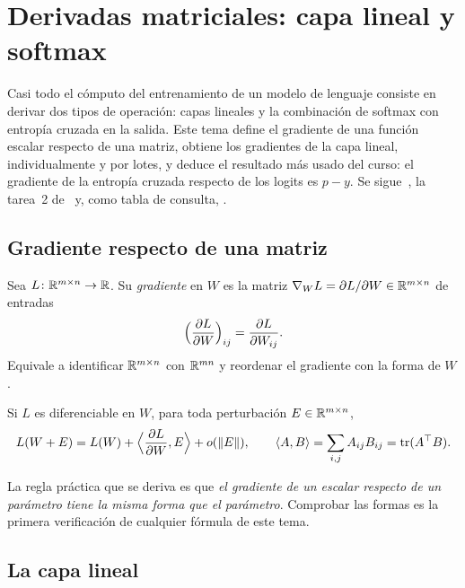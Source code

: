 \chapter{Derivadas matriciales: capa lineal y softmax}
\label{tema:3}

Casi todo el cómputo del entrenamiento de un modelo de lenguaje consiste en derivar dos tipos de operación: capas lineales y la combinación de softmax con entropía cruzada en la salida. Este tema define el gradiente de una función escalar respecto de una matriz, obtiene los gradientes de la capa lineal, individualmente y por lotes, y deduce el resultado más usado del curso: el gradiente de la entropía cruzada respecto de los logits es $p-y$. Se sigue~\cite[§5.3--§5.5]{mml}, la tarea~2 de~\cite{cs224n} y, como tabla de consulta, \cite{cookbook}.

\section{Gradiente respecto de una matriz}

\begin{definicion}\label{def:grad-matriz}
Sea $L\colon\mathbb{R}^{m\times n}\to\mathbb{R}$. Su \emph{gradiente} en $W$ es la matriz $\nabla_W L=\partial L/\partial W\in\mathbb{R}^{m\times n}$ de entradas
\[
\Bigl(\frac{\partial L}{\partial W}\Bigr)_{ij}=\frac{\partial L}{\partial W_{ij}}.
\]
Equivale a identificar $\mathbb{R}^{m\times n}$ con $\mathbb{R}^{mn}$ y reordenar el gradiente con la forma de $W$.
\end{definicion}

\begin{proposicion}\label{prop:frobenius}
Si $L$ es diferenciable en $W$, para toda perturbación $E\in\mathbb{R}^{m\times n}$,
\[
L(W+E)=L(W)+\Bigl\langle\frac{\partial L}{\partial W},E\Bigr\rangle+o(\lVert E\rVert),\qquad
\langle A,B\rangle=\sum_{i,j}A_{ij}B_{ij}=\operatorname{tr}(A^{\top} B).
\]
\end{proposicion}

La regla práctica que se deriva es que \emph{el gradiente de un escalar respecto de un parámetro tiene la misma forma que el parámetro}. Comprobar las formas es la primera verificación de cualquier fórmula de este tema.

\section{La capa lineal}

